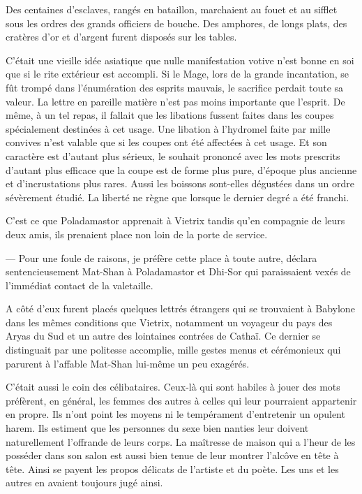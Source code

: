 \documentclass[a4paper, 11pt, oneside, polutonikogreek, french]{article}
\begin{document}
Des centaines d'esclaves, rangés en bataillon, marchaient au fouet et au sifflet sous les ordres des grands officiers de bouche. Des amphores, de longs plats, des cratères d'or et d'argent furent disposés sur les tables.

C'était une vieille idée asiatique que nulle manifestation votive n'est bonne en soi que si le rite extérieur est accompli. Si le Mage, lors de la grande incantation, se fût trompé dans l'énumération des esprits mauvais, le sacrifice perdait toute sa valeur. La lettre en pareille matière n'est pas moins importante que l'esprit. De même, à un tel repas, il fallait que les libations fussent faites dans les coupes spécialement destinées à cet usage. Une libation à l'hydromel faite par mille convives n'est valable que si les coupes ont été affectées à cet usage. Et son caractère est d'autant plus sérieux, le souhait prononcé avec les mots prescrits d'autant plus efficace que la coupe est de forme plus pure, d'époque plus ancienne et d'incrustations plus rares. Aussi les boissons sont-elles dégustées dans un ordre sévèrement étudié. La liberté ne règne que lorsque le dernier degré a été franchi.

C'est ce que Poladamastor apprenait à Vietrix tandis qu'en compagnie de leurs deux amis, ils prenaient place non loin de la porte de service.

--- Pour une foule de raisons, je préfère cette place à toute autre, déclara sentencieusement Mat-Shan à Poladamastor et Dhi-Sor qui paraissaient vexés de l'immédiat contact de la valetaille.

A côté d'eux furent placés quelques lettrés étrangers qui se trouvaient à Babylone dans les mêmes conditions que Vietrix, notamment un voyageur du pays des Aryas du Sud et un autre des lointaines contrées de Cathaï. Ce dernier se distinguait par une politesse accomplie, mille gestes menus et cérémonieux qui parurent à l'affable Mat-Shan lui-même un peu exagérés.

C'était aussi le coin des célibataires. Ceux-là qui sont habiles à jouer des mots préfèrent, en général, les femmes des autres à celles qui leur pourraient appartenir en propre. Ils n'ont point les moyens ni le tempérament d'entretenir un opulent harem. Ils estiment que les personnes du sexe bien nanties leur doivent naturellement l'offrande de leurs corps. La maîtresse de maison qui a l'heur de les posséder dans son salon est aussi bien tenue de leur montrer l'alcôve en tête à tête. Ainsi se payent les propos délicats de l'artiste et du poète. Les uns et les autres en avaient toujours jugé ainsi.
\end{document}
